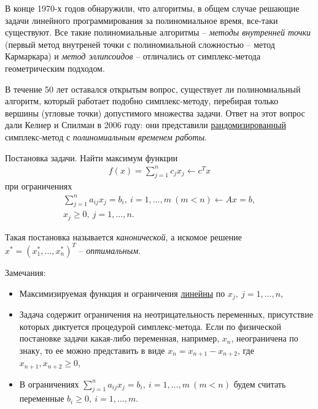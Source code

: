 \documentclass[%
	11pt,
	a4paper,
	utf8,
		]{article}
\begin{document}
В конце 1970-х годов обнаружили, что алгоритмы, в общем случае решающие задачи линейного программирования за полиномиальное время, все-таки существуют. Все такие полиномиальные алгоритмы -- \emph{методы внутренней точки} (первый метод внутреней точки с полиномиальной сложностью -- метод Кармаркара) и \emph{метод эллипсоидов} -- отличались от симплекс-метода геометрическим подходом.

В течение 50 лет оставался открытым вопрос, существует ли полиномиальный алгоритм, который работает подобно симплекс-методу, перебирая только вершины (угловые точки) допустимого множества задачи. Ответ на этот вопрос дали Келнер и Спилман в 2006 году: они представили \underline{рандомизированный} симплекс-метод с \emph{полиномиальным временем работы}.


Постановка задачи. Найти максимум функции
\begin{align*}
f(x) = \sum_{j=1}^{n} c_j x_j \leftarrow c^T x
\end{align*}
при ограничениях
\begin{align*}
	\sum_{j=1}^{n} a_{ij} x_j = b_i, \ i = 1, \ldots, m\  (m < n) \leftarrow Ax = b,\\
	x_j \geqslant 0, \ j = 1, \ldots, n.
\end{align*}

Такая постановка называется \emph{канонической}, а искомое решение $ x^{*} = (x_1^{*}, \ldots, x_n^{*})^T $ -- \emph{оптимальным}.

Замечания:
\begin{itemize}
	\item Максимизируемая функция и ограничения \underline{линейны} по $ x_j, \ j = 1, \ldots, n $,
	
	\item Задача содержит ограничения на неотрицательность переменных, присутствие которых диктуется процедурой симплекс-метода. Если по физической постановке задачи какая-либо переменная, например, $ x_n $, неограничена по знаку, то ее можно представить в виде $ x_n = x_{n+1} - x_{n+2} $, где $ x_{n+1}, x_{n+2} \geqslant 0 $,
	
	\item В ограничениях $ \sum\limits_{j=1}^{n} a_{ij} x_j = b_i, \ i = 1, \ldots, m\  (m < n) $ будем считать переменные $ b_i \geqslant 0, \ i = 1, \ldots, m $.
\end{itemize}
\end{document}
